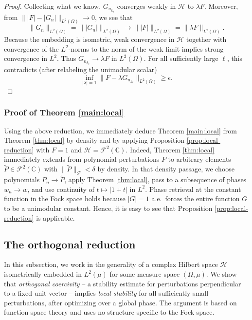 \documentclass[11pt]{amsart}
\theoremstyle{remark}
\begin{document}
\begin{proof}
Collecting what we know, \(G_{n_{k_\ell}}\) converges weakly in \(\mathcal{H}\) to
\(\lambda F\). Moreover, from
\(\lVert \lvert F \rvert-\lvert G_n \rvert \rVert_{L^2(\Omega)}\to0\), we see that
\[
\lVert G_n \rVert_{L^2(\Omega)}=\lVert \lvert G_n \rvert \rVert_{L^2(\Omega)}
\to
\lVert \lvert F \rvert \rVert_{L^2(\Omega)}
=\lVert \lambda F \rVert_{L^2(\Omega)}.
\]
Because the embedding is isometric, weak convergence in \(\mathcal{H}\) together with
convergence of the \(L^2\)-norms to the norm of the weak limit implies strong
convergence in \(L^2\). Thus \(G_{n_{k_\ell}}\to\lambda F\) in
\(L^2(\Omega)\). For all sufficiently large \(\ell\), this contradicts (after relabeling the unimodular scalar)
\[
\inf_{\lvert \lambda \rvert=1}
\lVert F-\lambda G_{n_{k_\ell}} \rVert_{L^2(\Omega)}
\ge \epsilon.
\]
\end{proof}
\subsubsection{Proof of Theorem \ref{main:local}} Using the above reduction, we immediately deduce Theorem \ref{main:local} from Theorem \ref{thm:local} by density and by applying Proposition \ref{prop:local-reduction} with $F=1$ and $\mathcal{H}=\mathcal{F}^2(\mathbb{C})$. Indeed, Theorem \ref{thm:local} immediately extends from polynomial perturbations $P$ to arbitrary elements $\widetilde{P}\in \mathcal{F}^2(\mathbb{C})$ with $\|\widetilde{P}\|_{\mathcal{F}} < \delta$ by density. In that density passage, we choose polynomials $P_n \to \widetilde{P}$, apply Theorem \ref{thm:local}, pass to a subsequence of phases $w_n \to w$, and use continuity of $t \mapsto |1+t|$ in $L^2$.
Phase retrieval at the constant function in the Fock space holds because $|G| = 1$ a.e.~forces the entire function $G$ to be a unimodular constant. Hence, it is easy to see that Proposition \ref{prop:local-reduction} is applicable.
\subsection{The orthogonal reduction}\label{subsec:reduction}
In this subsection, we work in the generality of a complex Hilbert space $\mathcal{H}$
isometrically embedded in $L^2(\mu)$ for some measure space $(\Omega, \mu)$.
We show that \emph{orthogonal coercivity} -- a stability estimate for
perturbations perpendicular to a fixed unit vector -- implies \emph{local
stability} for all sufficiently small perturbations, after optimizing over a
global phase.  The argument is based on function space theory and uses no
structure specific to the Fock space. 
\end{document}
